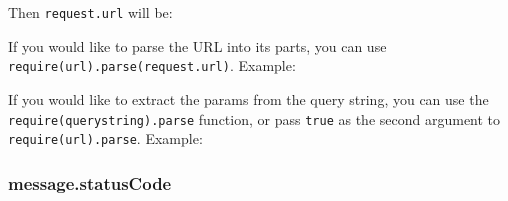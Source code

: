 Then \texttt{request.url} will be:

\begin{Shaded}
\begin{Highlighting}[]
\end{Highlighting}
\end{Shaded}

If you would like to parse the URL into its parts, you can use
\texttt{require(\textquotesingle{}url\textquotesingle{}).parse(request.url)}.
Example:

\begin{Shaded}
\begin{Highlighting}[]
\NormalTok{(}\NormalTok{(}\NormalTok{)}
\NormalTok{\{ }\NormalTok{: }\NormalTok{,}
  \NormalTok{: }\NormalTok{,}
  \NormalTok{: }\NormalTok{,}
  \NormalTok{: } \NormalTok{\}}
\end{Highlighting}
\end{Shaded}

If you would like to extract the params from the query string, you can
use the
\texttt{require(\textquotesingle{}querystring\textquotesingle{}).parse}
function, or pass \texttt{true} as the second argument to
\texttt{require(\textquotesingle{}url\textquotesingle{}).parse}.
Example:

\begin{Shaded}
\begin{Highlighting}[]
\NormalTok{(}\NormalTok{(}\NormalTok{, }\NormalTok{)}
\NormalTok{\{ }\NormalTok{: }\NormalTok{,}
  \NormalTok{: }\NormalTok{,}
  \NormalTok{: \{ }\NormalTok{: } \NormalTok{\},}
  \NormalTok{: } \NormalTok{\}}
\end{Highlighting}
\end{Shaded}

\subsubsection{message.statusCode}\label{message.statuscode}

